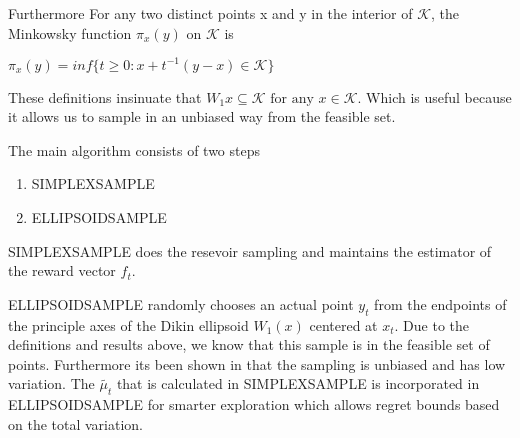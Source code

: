 Furthermore For any two distinct points x and y in the interior of $\mathcal{K}$,   the Minkowsky
function $\pi_x(y)$ on $\mathcal{K}$ is 

$\pi_x(y) = inf \{t \geq 0 : x + t^{-1}(y - x) \in \mathcal{K} \}$

These definitions insinuate that $W_1{x} \subseteq \mathcal{K} \text{ for any } x \in \mathcal{K}$. Which 
is useful because it allows us  to sample in an unbiased way from the feasible set.

The main algorithm consists of two steps 
\begin{enumerate}
\item
  SIMPLEXSAMPLE
\item
  ELLIPSOIDSAMPLE
\end{enumerate}

SIMPLEXSAMPLE does the resevoir sampling and maintains the estimator of the reward vector
$f_t$. 

ELLIPSOIDSAMPLE randomly chooses an actual point $y_t$ from the endpoints of the
principle axes of the Dikin ellipsoid $W_1(x)$ centered at $x_t$. Due to the definitions and 
results above, we know that this sample is in the feasible set of points. Furthermore its been shown in \citep{abernethy} that the sampling is unbiased and has low variation.
The  $\tilde{\mu_t}$ that is calculated in SIMPLEXSAMPLE is incorporated in ELLIPSOIDSAMPLE for smarter exploration which allows regret bounds based on the total
variation. 
